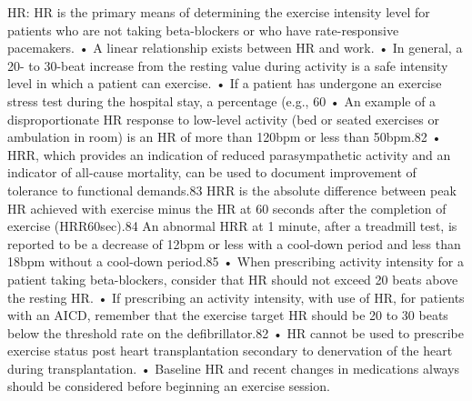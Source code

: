 HR: HR is the primary means of determining the exercise intensity level for patients who are not taking beta-blockers or who have rate-responsive pacemakers.
•	A linear relationship exists between HR and work.
•	In general, a 20- to 30-beat increase from the resting value during activity is a safe intensity level in which a patient can exercise.
•	If a patient has undergone an exercise stress test during the hospital stay, a percentage (e.g., 60%
•	An example of a disproportionate HR response to low-level activity (bed or seated exercises or ambulation in room) is an HR of more than 120bpm or less than 50bpm.82
•	HRR, which provides an indication of reduced parasympathetic activity and an indicator of all-cause mortality, can be used to document improvement of tolerance to functional demands.83 HRR is the absolute difference between peak HR achieved with exercise minus the HR at 60 seconds after the completion of exercise (HRR60sec).84 An abnormal HRR at 1 minute, after a treadmill test, is reported to be a decrease of 12bpm or less with a cool-down period and less than 18bpm without a cool-down period.85
•	When prescribing activity intensity for a patient taking beta-blockers, consider that HR should not exceed 20 beats above the resting HR.
•	If prescribing an activity intensity, with use of HR, for patients with an AICD, remember that the exercise target HR should be 20 to 30 beats below the threshold rate on the defibrillator.82
•	HR cannot be used to prescribe exercise status post heart transplantation secondary to denervation of the heart during transplantation.
•	Baseline HR and recent changes in medications always should be considered before beginning an exercise session.



